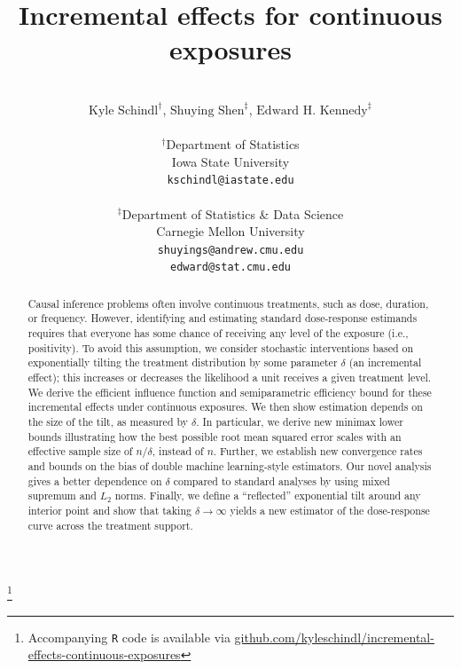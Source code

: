 \documentclass[11pt,twoside]{article}
\theoremstyle{definition}
\theoremstyle{remark}
\newcommand\blfootnote[1]{%
  \begingroup
  \renewcommand\thefootnote{}%
  \footnote{#1}%
  \addtocounter{footnote}{-1}%
  \endgroup
}
\begin{document}
\def\spacingset#1{\renewcommand{\baselinestretch}%
{#1}\small\normalsize} \spacingset{1}

\raggedbottom
\allowdisplaybreaks[1]



  
  \title{\vspace*{-.4in} {Incremental effects for continuous exposures}}
   \author{\\ $\text{Kyle Schindl}^{\dagger}$, $\text{Shuying Shen}^{\ddag}$, $\text{Edward H. Kennedy}^{\ddag}$ \\ \\
    $^{\dag}$Department of Statistics \\
    Iowa State University \\
    \texttt{kschindl@iastate.edu} \\ \\ 
    $^\ddag$Department of Statistics \& Data Science \\
    Carnegie Mellon University \\
    \texttt{shuyings@andrew.cmu.edu} \\
    \texttt{edward@stat.cmu.edu}
\date{}
    }
    
  \maketitle
  \thispagestyle{empty}

   \blfootnote{Accompanying \texttt{R} code is available via \href{https://github.com/kyleschindl/incremental-effects-continuous-exposures}{github.com/kyleschindl/incremental-effects-continuous-exposures}}
  
\begin{abstract}
Causal inference problems often involve continuous treatments, such as dose, duration, or frequency. However, identifying and estimating standard dose-response estimands requires that everyone has some chance of receiving any level of the exposure (i.e., positivity). To avoid this assumption, we consider stochastic interventions based on exponentially tilting the treatment distribution by some parameter $\delta$ (an incremental effect); this increases or decreases the likelihood a unit receives a given treatment level. We derive the efficient influence function and semiparametric efficiency bound for these incremental effects under continuous exposures. We then show estimation depends on the size of the tilt, as measured by $\delta$. In particular, we derive new minimax lower bounds illustrating how the best possible root mean squared error scales with an effective sample size of $n / \delta$, instead of $n$. Further, we establish new convergence rates and bounds on the bias of double machine learning-style estimators. Our novel analysis gives a better dependence on $\delta$ compared to standard analyses by using mixed supremum and $L_2$ norms. Finally, we define a ``reflected'' exponential tilt around any interior point and show that taking $\delta \to \infty$ yields a new estimator of the dose-response curve across the treatment support.
\end{abstract}
\end{document}
